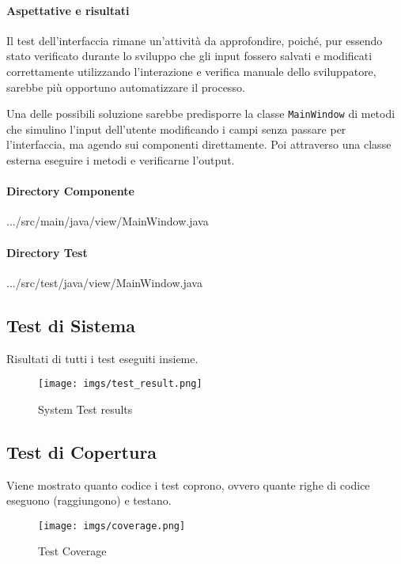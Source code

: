 \documentclass{article}
\begin{document}
\paragraph{Aspettative e risultati}
Il test dell'interfaccia rimane un'attività da approfondire, poiché, pur essendo stato verificato durante lo sviluppo che gli input fossero salvati e modificati correttamente utilizzando l'interazione e verifica manuale dello sviluppatore, sarebbe più opportuno automatizzare il processo. 

Una delle possibili soluzione sarebbe predisporre la classe \texttt{MainWindow} di metodi che simulino l'input dell'utente modificando i campi senza passare per l'interfaccia, ma agendo sui componenti direttamente. Poi attraverso una classe esterna eseguire i metodi e verificarne l'output. 

\paragraph{Directory Componente} 
\begin{code*}
    .../src/main/java/view/MainWindow.java
\end{code*}
\paragraph{Directory Test} 
\begin{code*}
    .../src/test/java/view/MainWindow.java
\end{code*}

\subsection{Test di Sistema}
Risultati di tutti i test eseguiti insieme. 
\begin{figure}[H]
    \centering
    \texttt{[image: imgs/test\_result.png]}
    \caption{System Test results}
    \label{fig:placeholder}
\end{figure}

\subsection{Test di Copertura}
Viene mostrato quanto codice i test coprono, ovvero quante righe di codice eseguono (raggiungono) e testano.
\begin{figure}[H]
    \centering
    \texttt{[image: imgs/coverage.png]}
    \caption{Test Coverage}
    \label{fig:placeholder}
\end{figure}
\end{document}
